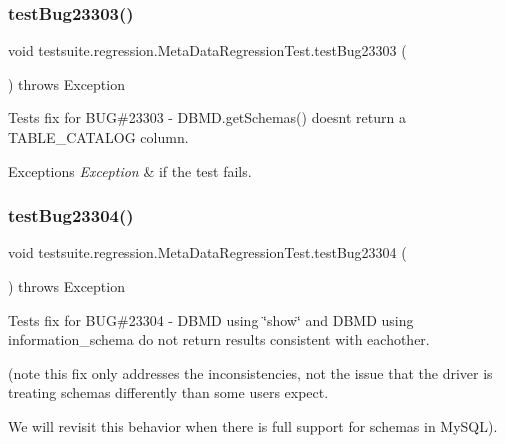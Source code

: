 \subsubsection{\texorpdfstring{test\+Bug23303()}{testBug23303()}}
{\footnotesize\ttfamily void testsuite.\+regression.\+Meta\+Data\+Regression\+Test.\+test\+Bug23303 (\begin{DoxyParamCaption}{ }\end{DoxyParamCaption}) throws Exception}

Tests fix for B\+UG\#23303 -\/ D\+B\+M\+D.\+get\+Schemas() doesn\textquotesingle{}t return a T\+A\+B\+L\+E\+\_\+\+C\+A\+T\+A\+L\+OG column.


\begin{DoxyExceptions}{Exceptions}
{\em Exception} & if the test fails. \\
\hline
\end{DoxyExceptions}
\mbox{\label{classtestsuite_1_1regression_1_1_meta_data_regression_test_a5182df6da64a360d62191fc3be70fa75}} 
\subsubsection{\texorpdfstring{test\+Bug23304()}{testBug23304()}}
{\footnotesize\ttfamily void testsuite.\+regression.\+Meta\+Data\+Regression\+Test.\+test\+Bug23304 (\begin{DoxyParamCaption}{ }\end{DoxyParamCaption}) throws Exception}

Tests fix for B\+UG\#23304 -\/ D\+B\+MD using \char`\"{}show\char`\"{} and D\+B\+MD using information\+\_\+schema do not return results consistent with eachother.

(note this fix only addresses the inconsistencies, not the issue that the driver is treating schemas differently than some users expect.

We will revisit this behavior when there is full support for schemas in My\+S\+QL).


